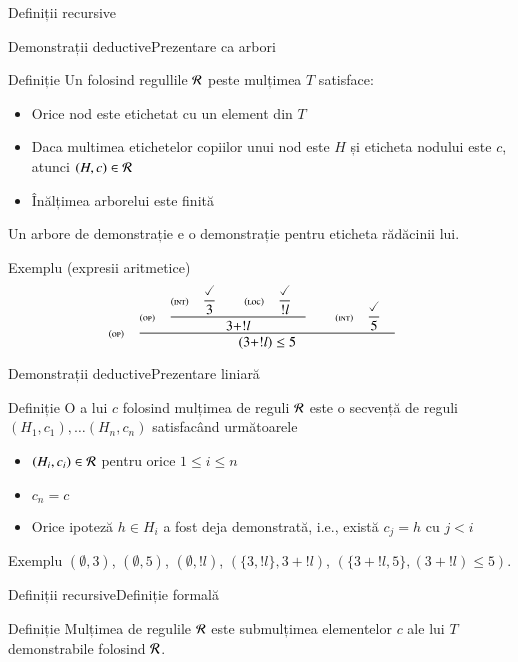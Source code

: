 \documentclass[xcolor=pdftex,romanian,colorlinks]{beamer}
\begin{document}
\begin{section}{Definiții recursive}
\begin{frame}{Demonstrații deductive}{Prezentare ca arbori}
   \begin{block}{Definiție}
       Un  folosind regullile $\cal R$ peste mulțimea $T$ satisface:
     \begin{itemize} 
         \item Orice nod este etichetat cu un element din $T$
        \item Daca multimea etichetelor copiilor unui nod este $H$ și eticheta nodului este $c$, atunci $(H,c) \in \cal R$
         \item Înălțimea arborelui este finită
      \end{itemize}
    Un arbore de demonstrație e o demonstrație pentru eticheta rădăcinii lui.
    \end{block}

 \begin{block}{Exemplu (expresii aritmetice)}
     \[\reg[op]{(3 + ! l) \leq 5 }{
            {\displaystyle\reg[op]{3 + ! l}{\displaystyle\reg[int]{3}{\done}{}\si \reg[loc]{ ! l}{\done}{}}{}\si \reg[int]{5}{\done}{}}{}}{}\]
  \end{block}
\end{frame}

\begin{frame}{Demonstrații deductive}{Prezentare liniară}
   \begin{block}{Definiție}
       O  a lui $c$ folosind mulțimea de reguli $\cal R$  este o secvență
de reguli $(H_1, c_1), \ldots (H_n, c_n)$ satisfacând următoarele    
     \begin{itemize}
          \item $(H_i, c_i) \in \cal R$ pentru orice $1\leq i \leq n$
          \item $c_n = c$
          \item Orice ipoteză $h \in H_i$ a fost deja demonstrată, i.e., există $c_j = h$ cu $j<i$ 
     \end{itemize}
    \end{block}

  \begin{block}{Exemplu}
      $(\emptyset, 3)$,
      $(\emptyset, 5)$,
      $(\emptyset, ! l)$,
      $(\{3, !l \}, 3 + ! l)$,
     $(\{3 + ! l, 5\}, (3 + ! l) \leq 5)$.
  \end{block}
\end{frame}

\begin{frame}{Definiții recursive}{Definiție formală}
  \begin{block}{Definiție}
     Mulțimea  de regulile ${\cal R}$ este submulțimea elementelor $c$ ale lui $T$ demonstrabile folosind ${\cal R}$.


\end{block}
\end{frame}
\end{section}
\end{document}

